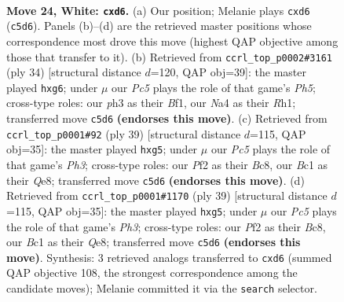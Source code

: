 \documentclass[11pt]{article}
\begin{document}
\clearpage

\begin{figure}[p]\centering
\begin{subfigure}{0.46\textwidth}\centering
\resizebox{\linewidth}{!}{%
\newchessgame
\chessboard[
  setfen={1r1r4/pppb1pk1/3p4/2P1b1qp/N3Pn2/5QPp/PP3P2/RBB1R1K1 w - - 3 24},
  showmover=false,
  pgfstyle=straightmove, color=movearrow, markmove={c5-d6}
]}
\caption{}
\end{subfigure}\hfill
\begin{subfigure}{0.46\textwidth}\centering
\resizebox{\linewidth}{!}{%
\newchessgame
\chessboard[
  setfen={r2r2k1/ppp2p1p/4bqp1/4n2P/2P1P3/P1Q5/1P1N1PP1/R3KB1R w KQ - 1 18},
  showmover=false,
  pgfstyle=straightmove, color=movearrow, markmove={h5-g6}
]}
\caption{}
\end{subfigure}
\\[4pt]
\begin{subfigure}{0.46\textwidth}\centering
\resizebox{\linewidth}{!}{%
\newchessgame
\chessboard[
  setfen={r1b1q3/4p1bk/p1npp2p/2p2rPP/P7/2NBB3/1PP5/R2QK1R1 b Q - 0 20},
  showmover=false,
  pgfstyle=straightmove, color=movearrow, markmove={h6-g5}
]}
\caption{}
\end{subfigure}\hfill
\begin{subfigure}{0.46\textwidth}\centering
\resizebox{\linewidth}{!}{%
\newchessgame
\chessboard[
  setfen={r1b1q3/4p1bk/p1npp2p/2p2rPP/P7/2NBB3/1PP5/R2QK1R1 b Q - 0 20},
  showmover=false,
  pgfstyle=straightmove, color=movearrow, markmove={h6-g5}
]}
\caption{}
\end{subfigure}
\caption{\textbf{Move 24, White: \texttt{cxd6}.} (a) Our position; Melanie plays \texttt{cxd6} (\texttt{c5d6}). Panels (b)--(d) are the retrieved master positions whose correspondence most drove this move (highest QAP objective among those that transfer to it). (b) Retrieved from \texttt{ccrl\_top\_p0002\#3161} (ply 34) [structural distance $d$=120, QAP obj=39]: the master played \texttt{hxg6}; under $\mu$ our \emph{Pc5} plays the role of that game's \emph{Ph5}; cross-type roles: our \emph{p}h3 as their \emph{B}f1, our \emph{N}a4 as their \emph{R}h1; transferred move \texttt{c5d6} \textbf{(endorses this move)}. (c) Retrieved from \texttt{ccrl\_top\_p0001\#92} (ply 39) [structural distance $d$=115, QAP obj=35]: the master played \texttt{hxg5}; under $\mu$ our \emph{Pc5} plays the role of that game's \emph{Ph3}; cross-type roles: our \emph{P}f2 as their \emph{B}c8, our \emph{B}c1 as their \emph{Q}e8; transferred move \texttt{c5d6} \textbf{(endorses this move)}. (d) Retrieved from \texttt{ccrl\_top\_p0001\#1170} (ply 39) [structural distance $d$=115, QAP obj=35]: the master played \texttt{hxg5}; under $\mu$ our \emph{Pc5} plays the role of that game's \emph{Ph3}; cross-type roles: our \emph{P}f2 as their \emph{B}c8, our \emph{B}c1 as their \emph{Q}e8; transferred move \texttt{c5d6} \textbf{(endorses this move)}. Synthesis: 3 retrieved analogs transferred to \texttt{cxd6} (summed QAP objective 108, the strongest correspondence among the candidate moves); Melanie committed it via the \texttt{search} selector.}
\label{fig:thought-m46}
\end{figure}
\end{document}

